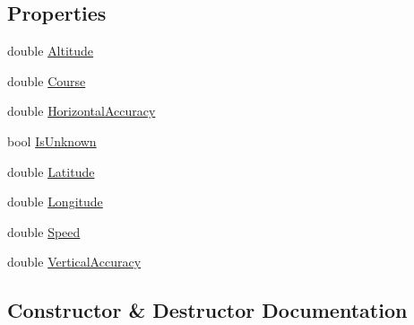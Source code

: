 \subsection*{Properties}
\begin{DoxyCompactItemize}
\item 
double \hyperlink{class_bibabook_1_1_models_1_1_geo_coordinate_affeafc1351b7ddb68d36c2c5272a5ff3}{Altitude}
\item 
double \hyperlink{class_bibabook_1_1_models_1_1_geo_coordinate_ab5910ce8981277862c6a224919c27599}{Course}
\item 
double \hyperlink{class_bibabook_1_1_models_1_1_geo_coordinate_a70d2b257194a78072e9afdc9ee14900a}{Horizontal\+Accuracy}
\item 
bool \hyperlink{class_bibabook_1_1_models_1_1_geo_coordinate_a44be5dcc7c55fe899bf61ed3926f31f3}{Is\+Unknown}
\item 
double \hyperlink{class_bibabook_1_1_models_1_1_geo_coordinate_afe40440ec4cc2460cfcd87a1cdc6828c}{Latitude}
\item 
double \hyperlink{class_bibabook_1_1_models_1_1_geo_coordinate_afdf659db7469b49685ee37246c2d46b6}{Longitude}
\item 
double \hyperlink{class_bibabook_1_1_models_1_1_geo_coordinate_a50a331168aeaf8c9b39624cb9956ccf4}{Speed}
\item 
double \hyperlink{class_bibabook_1_1_models_1_1_geo_coordinate_a40c08d058ae8d7908144a8d95603bd52}{Vertical\+Accuracy}
\end{DoxyCompactItemize}


\subsection{Constructor \& Destructor Documentation}
\hypertarget{class_bibabook_1_1_models_1_1_geo_coordinate_ada930087e98619c7d3720fa3264725ef}{}

